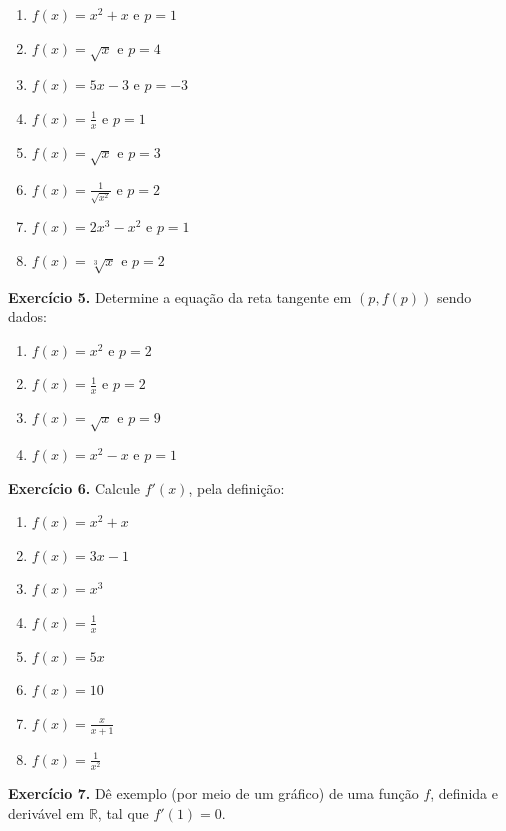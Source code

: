 \documentclass[12pt,a4paper]{article}
\begin{document}
\begin{enumerate}
    \renewcommand{\theenumi}{\alph{enumi}}
    \renewcommand{\labelenumi}{\theenumi)}
    \item $f(x) = x^2 + x$ e $p = 1$
    \item $f(x) = \sqrt{x}$ e $p = 4$
    \item $f(x) = 5x - 3$ e $p = -3$
    \item $f(x) = \frac{1}{x}$ e $p = 1$
    \item $f(x) = \sqrt{x}$ e $p = 3$
    \item $f(x) = \frac{1}{\sqrt{x^2}}$ e $p = 2$
    \item $f(x) = 2x^3 - x^2$ e $p = 1$
    \item $f(x) = \sqrt[3]{x}$ e $p = 2$
\end{enumerate}


\vspace{0.5cm}
\noindent\textbf{Exercício 5.} Determine a equação da reta tangente em $(p, f(p))$ sendo dados:

\begin{enumerate}
    \renewcommand{\theenumi}{\alph{enumi}}
    \renewcommand{\labelenumi}{\theenumi)}
    \item $f(x) = x^2$ e $p = 2$
    \item $f(x) = \frac{1}{x}$ e $p = 2$
    \item $f(x) = \sqrt{x}$ e $p = 9$
    \item $f(x) = x^2 - x$ e $p = 1$
\end{enumerate}


\vspace{0.5cm}
\noindent\textbf{Exercício 6.} Calcule $f'(x)$, pela definição:

\begin{enumerate}
    \renewcommand{\theenumi}{\alph{enumi}}
    \renewcommand{\labelenumi}{\theenumi)}
    \item $f(x) = x^2 + x$
    \item $f(x) = 3x - 1$
    \item $f(x) = x^3$
    \item $f(x) = \frac{1}{x}$
    \item $f(x) = 5x$
    \item $f(x) = 10$
    \item $f(x) = \frac{x}{x + 1}$
    \item $f(x) = \frac{1}{x^2}$
\end{enumerate}

\vspace{0.5cm}
\noindent\textbf{Exercício 7.} Dê exemplo (por meio de um gráfico) de uma função $f$, definida e derivável em $\mathbb{R}$, tal que $f'(1) = 0$.
\end{document}
